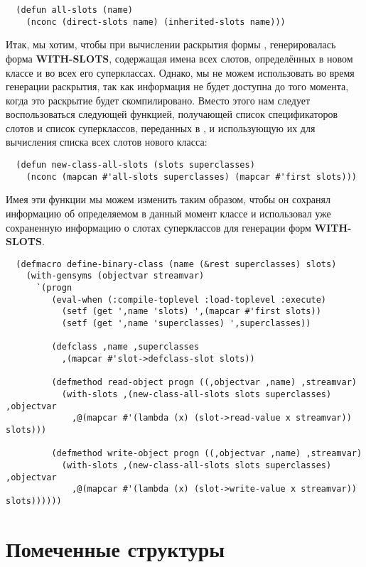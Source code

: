 \begin{lstlisting}
  (defun all-slots (name)
    (nconc (direct-slots name) (inherited-slots name)))
\end{lstlisting}

Итак, мы хотим, чтобы при вычислении раскрытия формы ,
генерировалась форма \textbf{WITH-SLOTS}, содержащая имена всех слотов, определённых в
новом классе и во всех его суперклассах. Однако, мы не можем использовать 
во время генерации раскрытия, так как информация не будет доступна до того момента, когда
это раскрытие будет скомпилировано. Вместо этого нам следует воспользоваться следующей
функцией, получающей список спецификаторов слотов и список суперклассов, переданных в
, и использующую их для вычисления списка всех слотов нового
класса:

\begin{lstlisting}
  (defun new-class-all-slots (slots superclasses)
    (nconc (mapcan #'all-slots superclasses) (mapcar #'first slots)))
\end{lstlisting}

Имея эти функции мы можем изменить  таким образом, чтобы он
сохранял информацию об определяемом в данный момент классе и использовал уже сохраненную
информацию о слотах суперклассов для генерации форм \textbf{WITH-SLOTS}.

\begin{lstlisting}
  (defmacro define-binary-class (name (&rest superclasses) slots)
    (with-gensyms (objectvar streamvar)
      `(progn
         (eval-when (:compile-toplevel :load-toplevel :execute)
           (setf (get ',name 'slots) ',(mapcar #'first slots))
           (setf (get ',name 'superclasses) ',superclasses))

         (defclass ,name ,superclasses
           ,(mapcar #'slot->defclass-slot slots))

         (defmethod read-object progn ((,objectvar ,name) ,streamvar)
           (with-slots ,(new-class-all-slots slots superclasses) ,objectvar
             ,@(mapcar #'(lambda (x) (slot->read-value x streamvar)) slots)))

         (defmethod write-object progn ((,objectvar ,name) ,streamvar)
           (with-slots ,(new-class-all-slots slots superclasses) ,objectvar
             ,@(mapcar #'(lambda (x) (slot->write-value x streamvar)) slots))))))
\end{lstlisting}

\section{Помеченные структуры}

